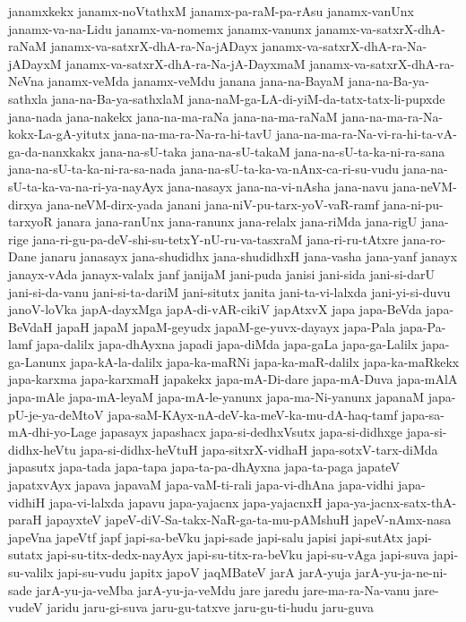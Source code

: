 {janamxkekx
janamx-noVtathxM
janamx-pa-raM-pa-rAsu
janamx-vanUnx
janamx-va-na-Lidu
janamx-va-nomemx
janamx-vanunx
janamx-va-satxrX-dhA-raNaM
janamx-va-satxrX-dhA-ra-Na-jADayx
janamx-va-satxrX-dhA-ra-Na-jADayxM
janamx-va-satxrX-dhA-ra-Na-jA-DayxmaM
janamx-va-satxrX-dhA-ra-NeVna
janamx-veMda
janamx-veMdu
janana
jana-na-BayaM
jana-na-Ba-ya-sathxla
jana-na-Ba-ya-sathxlaM
jana-naM-ga-LA-di-yiM-da-tatx-tatx-li-pupxde
jana-nada
jana-nakekx
jana-na-ma-raNa
jana-na-ma-raNaM
jana-na-ma-ra-Na-kokx-La-gA-yitutx
jana-na-ma-ra-Na-ra-hi-tavU
jana-na-ma-ra-Na-vi-ra-hi-ta-vA-ga-da-nanxkakx
jana-na-sU-taka
jana-na-sU-takaM
jana-na-sU-ta-ka-ni-ra-sana
jana-na-sU-ta-ka-ni-ra-sa-nada
jana-na-sU-ta-ka-va-nAnx-ca-ri-su-vudu
jana-na-sU-ta-ka-va-na-ri-ya-nayAyx
jana-nasayx
jana-na-vi-nAsha
jana-navu
jana-neVM-dirxya
jana-neVM-dirx-yada
janani
jana-niV-pu-tarx-yoV-vaR-ramf
jana-ni-pu-tarxyoR
janara
jana-ranUnx
jana-ranunx
jana-relalx
jana-riMda
jana-rigU
jana-rige
jana-ri-gu-pa-deV-shi-su-tetxY-nU-ru-va-tasxraM
jana-ri-ru-tAtxre
jana-ro-Dane
janaru
janasayx
jana-shudidhx
jana-shudidhxH
jana-vasha
jana-yanf
janayx
janayx-vAda
janayx-valalx
janf
janijaM
jani-puda
janisi
jani-sida
jani-si-darU
jani-si-da-vanu
jani-si-ta-dariM
jani-situtx
janita
jani-ta-vi-lalxda
jani-yi-si-duvu
janoV-loVka
japA-dayxMga
japA-di-vAR-cikiV
japAtxvX
japa
japa-BeVda
japa-BeVdaH
japaH
japaM
japaM-geyudx
japaM-ge-yuvx-dayayx
japa-Pala
japa-Pa-lamf
japa-dalilx
japa-dhAyxna
japadi
japa-diMda
japa-gaLa
japa-ga-Lalilx
japa-ga-Lanunx
japa-kA-la-dalilx
japa-ka-maRNi
japa-ka-maR-dalilx
japa-ka-maRkekx
japa-karxma
japa-karxmaH
japakekx
japa-mA-Di-dare
japa-mA-Duva
japa-mAlA
japa-mAle
japa-mA-leyaM
japa-mA-le-yanunx
japa-ma-Ni-yanunx
japanaM
japa-pU-je-ya-deMtoV
japa-saM-KAyx-nA-deV-ka-meV-ka-mu-dA-haq-tamf
japa-sa-mA-dhi-yo-Lage
japasayx
japashacx
japa-si-dedhxVsutx
japa-si-didhxge
japa-si-didhx-heVtu
japa-si-didhx-heVtuH
japa-sitxrX-vidhaH
japa-sotxV-tarx-diMda
japasutx
japa-tada
japa-tapa
japa-ta-pa-dhAyxna
japa-ta-paga
japateV
japatxvAyx
japava
japavaM
japa-vaM-ti-rali
japa-vi-dhAna
japa-vidhi
japa-vidhiH
japa-vi-lalxda
japavu
japa-yajacnx
japa-yajacnxH
japa-ya-jacnx-satx-thA-paraH
japayxteV
japeV-diV-Sa-takx-NaR-ga-ta-mu-pAMshuH
japeV-nAmx-nasa
japeVna
japeVtf
japf
japi-sa-beVku
japi-sade
japi-salu
japisi
japi-sutAtx
japi-sutatx
japi-su-titx-dedx-nayAyx
japi-su-titx-ra-beVku
japi-su-vAga
japi-suva
japi-su-valilx
japi-su-vudu
japitx
japoV
jaqMBateV
jarA
jarA-yuja
jarA-yu-ja-ne-ni-sade
jarA-yu-ja-veMba
jarA-yu-ja-veMdu
jare
jaredu
jare-ma-ra-Na-vanu
jare-vudeV
jaridu
jaru-gi-suva
jaru-gu-tatxve
jaru-gu-ti-hudu
jaru-guva
}
